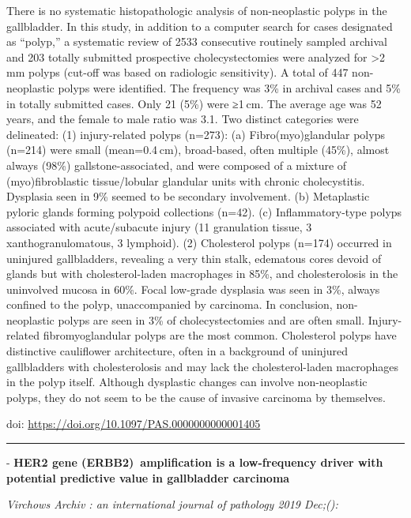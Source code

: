 \documentclass[
]{article}
\renewcommand{\linethickness}{0.05em}
\begin{document}
There is no systematic histopathologic analysis of non-neoplastic polyps
in the gallbladder. In this study, in addition to a computer search for
cases designated as ``polyp,'' a systematic review of 2533 consecutive
routinely sampled archival and 203 totally submitted prospective
cholecystectomies were analyzed for \textgreater2 mm polyps (cut-off was
based on radiologic sensitivity). A total of 447 non-neoplastic polyps
were identified. The frequency was 3\% in archival cases and 5\% in
totally submitted cases. Only 21 (5\%) were ≥1 cm. The average age was
52 years, and the female to male ratio was 3.1. Two distinct categories
were delineated: (1) injury-related polyps (n=273): (a)
Fibro(myo)glandular polyps (n=214) were small (mean=0.4 cm),
broad-based, often multiple (45\%), almost always (98\%)
gallstone-associated, and were composed of a mixture of
(myo)fibroblastic tissue/lobular glandular units with chronic
cholecystitis. Dysplasia seen in 9\% seemed to be secondary involvement.
(b) Metaplastic pyloric glands forming polypoid collections (n=42). (c)
Inflammatory-type polyps associated with acute/subacute injury (11
granulation tissue, 3 xanthogranulomatous, 3 lymphoid). (2) Cholesterol
polyps (n=174) occurred in uninjured gallbladders, revealing a very thin
stalk, edematous cores devoid of glands but with cholesterol-laden
macrophages in 85\%, and cholesterolosis in the uninvolved mucosa in
60\%. Focal low-grade dysplasia was seen in 3\%, always confined to the
polyp, unaccompanied by carcinoma. In conclusion, non-neoplastic polyps
are seen in 3\% of cholecystectomies and are often small. Injury-related
fibromyoglandular polyps are the most common. Cholesterol polyps have
distinctive cauliflower architecture, often in a background of uninjured
gallbladders with cholesterolosis and may lack the cholesterol-laden
macrophages in the polyp itself. Although dysplastic changes can involve
non-neoplastic polyps, they do not seem to be the cause of invasive
carcinoma by themselves.

doi: \url{https://doi.org/10.1097/PAS.0000000000001405}

\begin{center}\rule{0.5\linewidth}{\linethickness}\end{center}

- \textbf{HER2 gene (ERBB2)~amplification is a low-frequency driver with
potential predictive value in gallbladder carcinoma}

\emph{Virchows Archiv : an international journal of pathology 2019
Dec;():}
\end{document}
